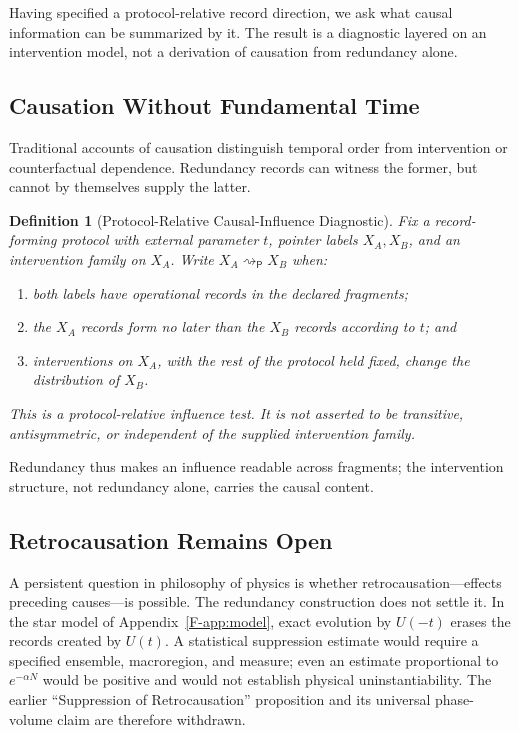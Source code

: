 \documentclass[12pt,a4paper,openany]{book}
\newtheorem{definition}[theorem]{Definition}
\begin{document}
Having specified a protocol-relative record direction, we ask what causal information can be summarized by it.  The result is a diagnostic layered on an intervention model, not a derivation of causation from redundancy alone.

\subsection{Causation Without Fundamental Time}

Traditional accounts of causation distinguish temporal order from intervention or counterfactual dependence.  Redundancy records can witness the former, but cannot by themselves supply the latter.

\begin{definition}[Protocol-Relative Causal-Influence Diagnostic]
\label{F-def:causal}
Fix a record-forming protocol with external parameter $t$, pointer labels $X_A,X_B$, and an intervention family on $X_A$.  Write $X_A\rightsquigarrow_{\mathsf P}X_B$ when:
\begin{enumerate}
    \item both labels have operational records in the declared fragments;
    \item the $X_A$ records form no later than the $X_B$ records according to $t$; and
    \item interventions on $X_A$, with the rest of the protocol held fixed, change the distribution of $X_B$.
\end{enumerate}
This is a protocol-relative influence test.  It is not asserted to be transitive, antisymmetric, or independent of the supplied intervention family.
\end{definition}

Redundancy thus makes an influence readable across fragments; the intervention structure, not redundancy alone, carries the causal content.

\subsection{Retrocausation Remains Open}

A persistent question in philosophy of physics is whether retrocausation---effects preceding causes---is possible.  The redundancy construction does not settle it.  In the star model of Appendix~\ref{F-app:model}, exact evolution by $U(-t)$ erases the records created by $U(t)$.  A statistical suppression estimate would require a specified ensemble, macroregion, and measure; even an estimate proportional to $e^{-\alpha N}$ would be positive and would not establish physical uninstantiability.  The earlier ``Suppression of Retrocausation'' proposition and its universal phase-volume claim are therefore withdrawn.
\end{document}
